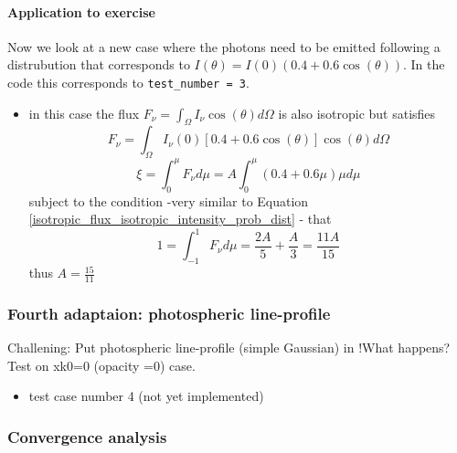 \documentclass[../main/main.tex]{subfiles}
\begin{document}
\newpage
\paragraph{Application to exercise}
Now we look at a new case where the photons need to be emitted following a distrubution that corresponds to $I(\theta) = I(0)(0.4+0.6\cos(\theta))$. In the code this corresponds to \texttt{test\_number = 3}. 
\begin{itemize}
\item in this case the flux $F_{\nu} = \int_{\Omega} I_{\nu} \cos(\theta) d\Omega$ is also isotropic but satisfies
\begin{equation}
F_{\nu} = \int_{\Omega} I_{\nu}(0)[0.4+0.6\cos(\theta)] \cos(\theta) d\Omega
\end{equation} 
\begin{equation}
\xi = \int_0^{\mu} F_{\nu} d\mu = A \int_0^{\mu} (0.4+0.6\mu) \mu d\mu   
\end{equation}
subject to the condition -very similar to Equation \ref{isotropic_flux_isotropic_intensity_prob_dist} - that
\begin{equation}
1 = \int_{-1}^{1} F_{\nu} d\mu = \frac{2A}{5} + \frac{A}{3} = \frac{11A}{15}
\end{equation}
thus $A = \frac{15}{11}$
\end{itemize}

\newpage
\subsubsection{Fourth adaptaion: photospheric line-profile}
Challening: Put photospheric line-profile (simple Gaussian) in
!What happens? Test on xk0=0 (opacity =0) case.

\begin{itemize}
\item test case number 4 (not yet implemented)
\end{itemize}


\newpage
\subsubsection{Convergence analysis}


\newpage
\end{document}
